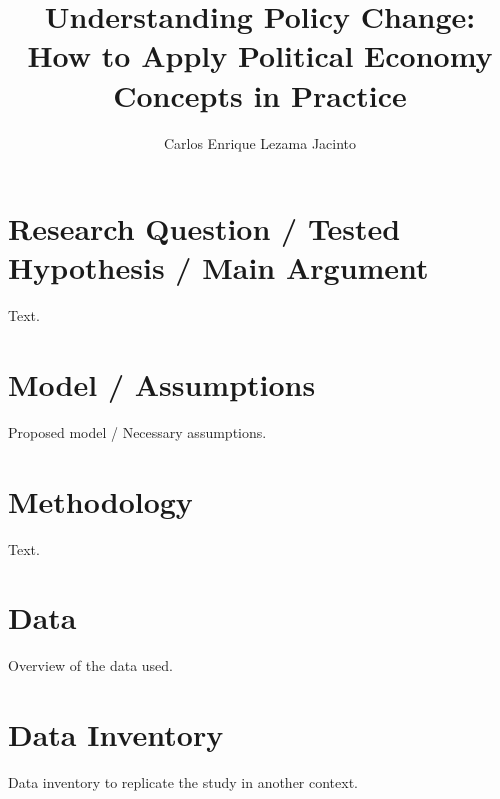 \documentclass[9pt,twocolumn,twoside,]{pnas-new}
\title{Understanding Policy Change: How to Apply Political Economy
Concepts in Practice}
\author[]{Carlos Enrique Lezama Jacinto}
\affil[]{Instituto Tecnológico Autónomo de México}
\begin{document}
\verticaladjustment{-2pt}



\maketitle
\thispagestyle{firststyle}


\acknow{}

\hypertarget{research-question-tested-hypothesis-main-argument}{%
\section*{Research Question / Tested Hypothesis / Main
Argument}\label{research-question-tested-hypothesis-main-argument}}

Text.

\hypertarget{model-assumptions}{%
\section*{Model / Assumptions}\label{model-assumptions}}

Proposed model / Necessary assumptions.

\hypertarget{methodology}{%
\section*{Methodology}\label{methodology}}

Text.

\hypertarget{data}{%
\section*{Data}\label{data}}

Overview of the data used.

\hypertarget{data-inventory}{%
\section*{Data Inventory}\label{data-inventory}}

Data inventory to replicate the study in another context.

\showmatmethods
\showacknow
\pnasbreak



% 
\end{document}
